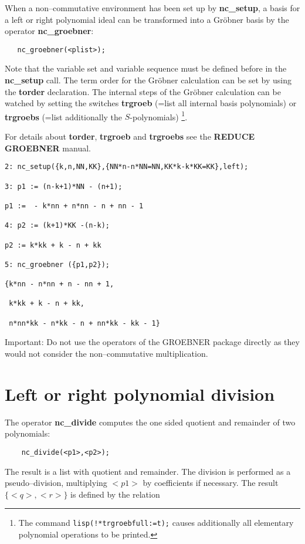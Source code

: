 When a non--commutative environment has been set up
by {\bf nc\_setup}, a basis for a left or right polynomial ideal
can be transformed into a Gr\"obner basis by the operator
{\bf nc\_groebner}:
\begin{verbatim}
   nc_groebner(<plist>);
\end{verbatim}
Note that the variable set and variable sequence must be
defined before in the {\bf nc\_setup} call. The term order
for the Gr\"obner calculation can be set by using the
{\bf torder} declaration. The internal steps of the
Gr\"obner calculation can be watched by setting the
switches {\bf trgroeb} (=list all internal basis polynomials)
or {\bf trgroebs} (=list additionally the $S$-polynomials)
\footnote{The command \verb+lisp(!*trgroebfull:=t);+ causes additionally
all elementary polynomial operations to be printed.}.


For details about {\bf torder}, {\bf trgroeb} and {\bf trgroebs}
see the {\bf {\small REDUCE} GROEBNER} manual.
\begin{verbatim}
2: nc_setup({k,n,NN,KK},{NN*n-n*NN=NN,KK*k-k*KK=KK},left);

3: p1 := (n-k+1)*NN - (n+1);

p1 :=  - k*nn + n*nn - n + nn - 1

4: p2 := (k+1)*KK -(n-k);

p2 := k*kk + k - n + kk

5: nc_groebner ({p1,p2});

{k*nn - n*nn + n - nn + 1,

 k*kk + k - n + kk,

 n*nn*kk - n*kk - n + nn*kk - kk - 1}

\end{verbatim}
Important: Do not use the operators of the GROEBNER
package directly as they would not consider the non--commutative
multiplication.

\section{Left or right polynomial division}

The operator {\bf nc\_divide} computes the one sided quotient and remainder of
two polynomials:
\begin{verbatim}
    nc_divide(<p1>,<p2>);
\end{verbatim}
The result is a list with quotient and remainder.
The division is performed as a pseudo--division, multiplying
$<p1>$ by coefficients if necessary. The result $\{<q>,<r>\}$
is defined by the relation

